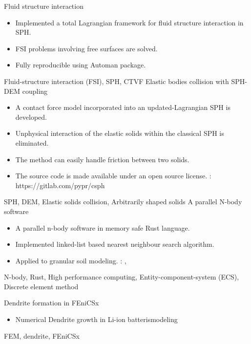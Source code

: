 \begin{experiences}
  \emptySeparator
  \experience
  {} {Fluid structure interaction}{}{}
  {}    {
    \begin{itemize}
        \item Implemented a total Lagrangian framework for fluid structure interaction in SPH.
        \item FSI problems involving free surfaces are solved.
        \item Fully reproducible using Automan package.
    \end{itemize}
  }
  {Fluid-structure interaction (FSI), SPH, CTVF}
  \emptySeparator
  \experience
  {} {Elastic bodies collision with SPH-DEM coupling}{}{}
  {} {
                      \begin{itemize}
                      \item  A contact force model incorporated into an updated-Lagrangian SPH is developed.
                      \item  Unphysical interaction of the elastic solids within the classical SPH is eliminated.
                      \item  The method can easily handle friction between two solids.
                      \item  The source code is made available under an open source license.
                        \faGithub:  {https://gitlab.com/pypr/csph}
                      \end{itemize}
                    }
                    {SPH, DEM, Elastic solids collision, Arbitrarily shaped solids}
  \emptySeparator
  \experience
  {} {A parallel N-body software}{}{}
  {}    {
    \begin{itemize}
      \item A parallel n-body software in memory safe Rust language.
      \item Implemented linked-list based nearest neighbour search algorithm.
      \item Applied to granular soil modeling.
        \faGithub: ,
    \end{itemize}
  }
  {N-body, Rust, High performance computing, Entity-component-system (ECS), Discrete element method}

  \emptySeparator
  \experience
  {} {Dendrite formation in FEniCSx}{}{}
  {}    {
    \begin{itemize}
    \item Numerical Dendrite growth in Li-ion batterismodeling
    \end{itemize}
  }
  {FEM, dendrite, FEniCSx}
\end{experiences}
